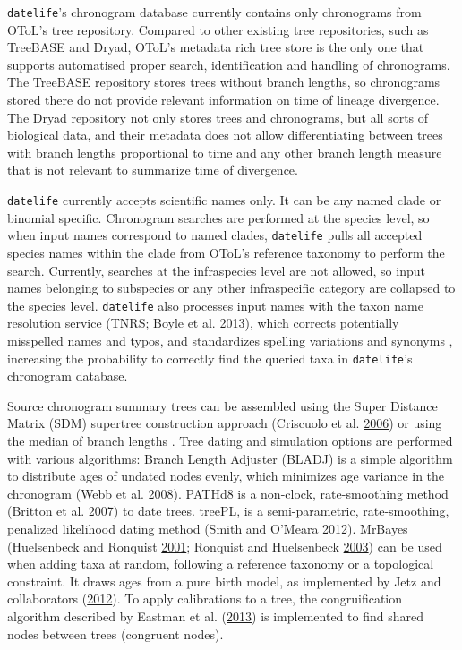 \documentclass[]{article}
\begin{document}
\texttt{datelife}'s chronogram database currently contains only chronograms from OToL's
tree repository. Compared to other existing tree repositories, such as TreeBASE and
Dryad, OToL's metadata rich tree store is the only one that supports automatised proper search, identification and handling of chronograms. The TreeBASE repository stores trees without branch lengths, so chronograms stored there do not provide relevant information on time of lineage divergence. The Dryad repository not only stores trees and chronograms, but all sorts of biological data, and their metadata does not allow differentiating between trees with branch lengths proportional to time and any other branch length measure that is not relevant to summarize time of divergence.

\texttt{datelife} currently accepts scientific names only. It can be any named clade or binomial specific.
Chronogram searches are performed at the species level, so when input names correspond
to named clades, \texttt{datelife} pulls all accepted species names within the
clade from OToL's reference taxonomy to perform the search.
Currently, searches at the infraspecies level are not allowed, so input names belonging to subspecies or any other infraspecific category are collapsed to the species level.
\texttt{datelife} also processes input names with the taxon name resolution service (TNRS; Boyle et al. \protect\hyperlink{ref-Boyle2013}{2013}),
which corrects potentially misspelled names and typos, and standardizes spelling
variations and synonyms , increasing the probability to correctly find the
queried taxa in \texttt{datelife}'s chronogram database.

Source chronogram summary trees can be assembled using the Super Distance Matrix
(SDM) supertree construction approach (Criscuolo et al. \protect\hyperlink{ref-Criscuolo2006}{2006}) or using the median of branch
lengths .
Tree dating and simulation options are performed with various algorithms:
Branch Length Adjuster (BLADJ) is a simple algorithm to distribute ages of undated
nodes evenly, which minimizes age variance in the chronogram (Webb et al. \protect\hyperlink{ref-Webb2008}{2008}).
PATHd8 is a non-clock, rate-smoothing method (Britton et al. \protect\hyperlink{ref-Britton2007}{2007}) to date trees.
treePL, is a semi-parametric, rate-smoothing, penalized likelihood dating method
(Smith and O'Meara \protect\hyperlink{ref-Smith2012}{2012}).
MrBayes (Huelsenbeck and Ronquist \protect\hyperlink{ref-Huelsenbeck2001}{2001}; Ronquist and Huelsenbeck \protect\hyperlink{ref-Ronquist2003}{2003}) can be used when adding taxa at
random, following a reference taxonomy or a topological constraint. It draws ages
from a pure birth model, as implemented by Jetz and collaborators (\protect\hyperlink{ref-Jetz2012}{2012}).
To apply calibrations to a tree, the congruification algorithm described by Eastman et al. (\protect\hyperlink{ref-Eastman2013}{2013})
is implemented to find shared nodes between trees (congruent nodes).
\end{document}
